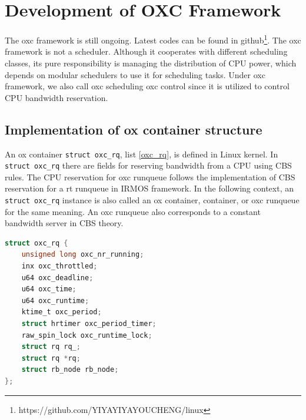\chapter{Development of OXC Framework\label{chap:impl}}
The oxc framework is still ongoing. Latest codes can be found 
in github\footnote{https://github.com/YIYAYIYAYOUCHENG/linux}.
The oxc framework is not a scheduler. Although it cooperates with
different scheduling classes, its pure responsibility is managing 
the distribution of CPU power, which depends on modular schedulers 
to use it for scheduling tasks. Under oxc framework, we also call
oxc scheduling oxc control since it is utilized to control CPU 
bandwidth reservation.

\section{Implementation of ox container structure}
An ox container \texttt{struct oxc\_rq}, list \ref{oxc_rq}, is 
defined in Linux kernel. In \texttt{struct oxc\_rq} there are 
fields for reserving bandwidth from a CPU using CBS rules. The 
CPU reservation for oxc runqueue follows the implementation of 
CBS reservation for a rt runqueue in IRMOS framework. In the 
following context, an \texttt{struct oxc\_rq} instance is also 
called an ox container, container, or oxc runqueue for the same 
meaning. An oxc runqueue also corresponds to a constant bandwidth 
server in CBS theory. 
\begin{lstlisting}[language=C, caption={\texttt{struct oxc\_rq}},
                        label={oxc_rq}]
struct oxc_rq {
	unsigned long oxc_nr_running;
	inx oxc_throttled;
	u64 oxc_deadline;
	u64 oxc_time;
	u64 oxc_runtime;
	ktime_t oxc_period;
	struct hrtimer oxc_period_timer;
	raw_spin_lock oxc_runtime_lock;
	struct rq rq_;
	struct rq *rq;
	struct rb_node rb_node;
};
\end{lstlisting}

